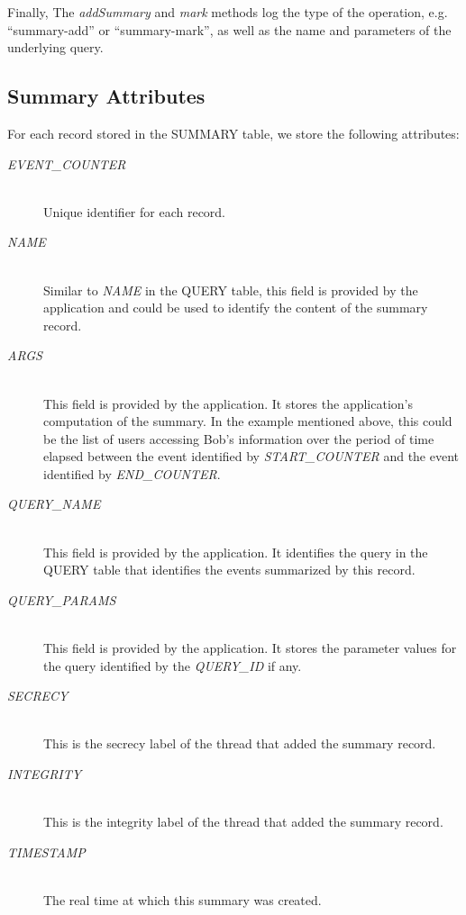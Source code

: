 Finally, The \emph{addSummary} and \emph{mark} methods log the type of the operation, e.g. ``summary-add'' or ``summary-mark'', as well as the name and parameters of the underlying query.

\subsection{Summary Attributes}

For each record stored in the SUMMARY table, we store the following attributes:

\begin{description}
  \item[\emph{EVENT\_COUNTER}] \ \\
    Unique identifier for each record.
  \item[\emph{NAME}] \ \\
    Similar to \emph{NAME} in the QUERY table,
    this field is provided by the application and
    could be used to identify the content of the
    summary record.
  \item[\emph{ARGS}] \ \\
    This field is provided by the application.
    It stores the application's computation of the summary.
    In the example mentioned above, this could be the 
    list of users accessing Bob's information over the
    period of time elapsed between the event
    identified by \emph{START\_COUNTER} and the
    event identified by \emph{END\_COUNTER}.
  \item[\emph{QUERY\_NAME}] \ \\
    This field is provided by the application.
    It identifies the query in the QUERY table
    that identifies the events summarized
    by this record.
  \item[\emph{QUERY\_PARAMS}] \ \\
    This field is provided by the application.
    It stores the parameter values for the query
    identified by the \emph{QUERY\_ID} if any.
  \item[\emph{SECRECY}] \ \\
    This is the secrecy label of the thread 
    that added the summary record.
  \item[\emph{INTEGRITY}] \ \\
    This is the integrity label of the thread 
    that added the summary record.
  \item[\emph{TIMESTAMP}] \ \\
    The real time at which this summary was created.
\end{description}

